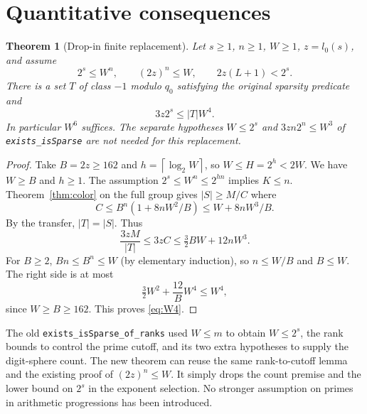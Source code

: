 \documentclass[11pt]{article}
\newtheorem{theorem}{Theorem}[section]
\theoremstyle{remark}\newtheorem{remark}[theorem]{Remark}
\newcommand{\ceil}[1]{\left\lceil #1\right\rceil}
\newcommand{\src}[1]{\texttt{#1}}
\begin{document}
\section{Quantitative consequences}\label{sec:bounds}
\begin{theorem}[Drop-in finite replacement]\label{thm:drop}
Let $s\ge1$, $n\ge1$, $W\ge1$, $z=l_0(s)$, and assume
\[
 2^s\le W^n,\qquad (2z)^n\le W,\qquad 2z(L+1)<2^s.
\]
There is a set $T$ of class $-1$ modulo $q_0$ satisfying the original sparsity predicate and
\begin{equation}\label{eq:W4}
 3z2^s\le |T|W^4.
\end{equation}
In particular $W^6$ suffices. The separate hypotheses $W\le2^s$ and $3zn2^n\le W^3$ of \src{exists\_isSparse} are not needed for this replacement.
\end{theorem}
\begin{proof}
Take $B=2z\ge162$ and $h=\ceil{\log_2 W}$, so $W\le H=2^h<2W$. We have $W\ge B$ and $h\ge1$. The assumption $2^s\le W^n\le 2^{hn}$ implies $K\le n$. Theorem~\ref{thm:color} on the full group gives $|S|\ge M/C$ where
\[
 C\le B^n(1+8nW^2/B)\le W+8nW^3/B.
\]
By the transfer, $|T|=|S|$. Thus
\[
 \frac{3z M}{|T|}\le 3zC\le\tfrac32 BW+12nW^3.
\]
For $B\ge2$, $Bn\le B^n\le W$ (by elementary induction), so $n\le W/B$ and $B\le W$. The right side is at most
\[
 \tfrac32 W^2+\frac{12}{B}W^4\le W^4,
\]
since $W\ge B\ge162$. This proves \eqref{eq:W4}.
\end{proof}

The old \src{exists\_isSparse\_of\_ranks} used $W\le m$ to obtain $W\le 2^s$, the rank bounds to control the prime cutoff, and its two extra hypotheses to supply the digit-sphere count. The new theorem can reuse the same rank-to-cutoff lemma and the existing proof of $(2z)^n\le W$. It simply drops the count premise and the lower bound on $2^s$ in the exponent selection. No stronger assumption on primes in arithmetic progressions has been introduced.
\end{document}
